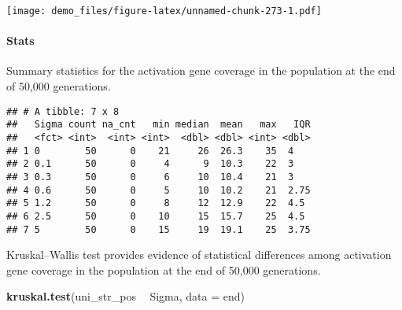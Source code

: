 \documentclass[]{book}
\newenvironment{Shaded}{\begin{snugshade}}{\end{snugshade}}
\newcommand{\DataTypeTok}[1]{\textcolor[rgb]{0.13,0.29,0.53}{#1}}
\newcommand{\KeywordTok}[1]{\textcolor[rgb]{0.13,0.29,0.53}{\textbf{#1}}}
\newcommand{\NormalTok}[1]{#1}
\newcommand{\OperatorTok}[1]{\textcolor[rgb]{0.81,0.36,0.00}{\textbf{#1}}}
\newcommand{\OtherTok}[1]{\textcolor[rgb]{0.56,0.35,0.01}{#1}}
\newcommand{\StringTok}[1]{\textcolor[rgb]{0.31,0.60,0.02}{#1}}
\let\oldparagraph\paragraph
\renewcommand{\paragraph}[1]{\oldparagraph{#1}\mbox{}}
\begin{document}
\texttt{[image: demo\_files/figure-latex/unnamed-chunk-273-1.pdf]}

\hypertarget{stats-52}{%
\paragraph{Stats}\label{stats-52}}

Summary statistics for the activation gene coverage in the population at the end of 50,000 generations.

\begin{Shaded}
\end{Shaded}

\begin{verbatim}
## # A tibble: 7 x 8
##   Sigma count na_cnt   min median  mean   max   IQR
##   <fct> <int>  <int> <int>  <dbl> <dbl> <int> <dbl>
## 1 0        50      0    21     26  26.3    35  4   
## 2 0.1      50      0     4      9  10.3    22  3   
## 3 0.3      50      0     6     10  10.4    21  3   
## 4 0.6      50      0     5     10  10.2    21  2.75
## 5 1.2      50      0     8     12  12.9    22  4.5 
## 6 2.5      50      0    10     15  15.7    25  4.5 
## 7 5        50      0    15     19  19.1    25  3.75
\end{verbatim}

Kruskal--Wallis test provides evidence of statistical differences among activation gene coverage in the population at the end of 50,000 generations.

\begin{Shaded}
\begin{Highlighting}[]
\KeywordTok{kruskal.test}\NormalTok{(uni_str_pos }\OperatorTok{~}\StringTok{ }\NormalTok{Sigma, }\DataTypeTok{data =}\NormalTok{ end)}
\end{Highlighting}
\end{Shaded}
\end{document}

